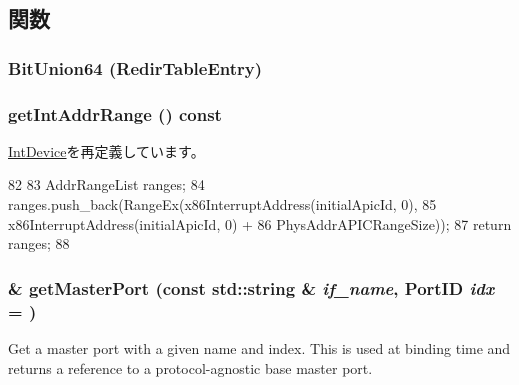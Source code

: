 \subsection{関数}
\hypertarget{classX86ISA_1_1I82094AA_a97c44df53cb92aeac5243310502a31f4}{
\subsubsection[{BitUnion64}]{\setlength{\rightskip}{0pt plus 5cm}BitUnion64 (RedirTableEntry)}}
\label{classX86ISA_1_1I82094AA_a97c44df53cb92aeac5243310502a31f4}
\hypertarget{classX86ISA_1_1I82094AA_ad86b339471781a0d7634d3c41c6a1c87}{
\subsubsection[{getIntAddrRange}]{ getIntAddrRange () const}}
\label{classX86ISA_1_1I82094AA_ad86b339471781a0d7634d3c41c6a1c87}


\hyperlink{classX86ISA_1_1IntDevice_ac142ed8f5e7f1e45022f45d316e131a3}{IntDevice}を再定義しています。


\begin{DoxyCode}
82 {
83     AddrRangeList ranges;
84     ranges.push_back(RangeEx(x86InterruptAddress(initialApicId, 0),
85                              x86InterruptAddress(initialApicId, 0) +
86                              PhysAddrAPICRangeSize));
87     return ranges;
88 }
\end{DoxyCode}
\hypertarget{classX86ISA_1_1I82094AA_adc4e675e51defbdd1e354dac729d0703}{
\subsubsection[{getMasterPort}]{ \& getMasterPort (const std::string \& {\em if\_\-name}, \/  {\bf PortID} {\em idx} = {})}}
\label{classX86ISA_1_1I82094AA_adc4e675e51defbdd1e354dac729d0703}
Get a master port with a given name and index. This is used at binding time and returns a reference to a protocol-\/agnostic base master port.


